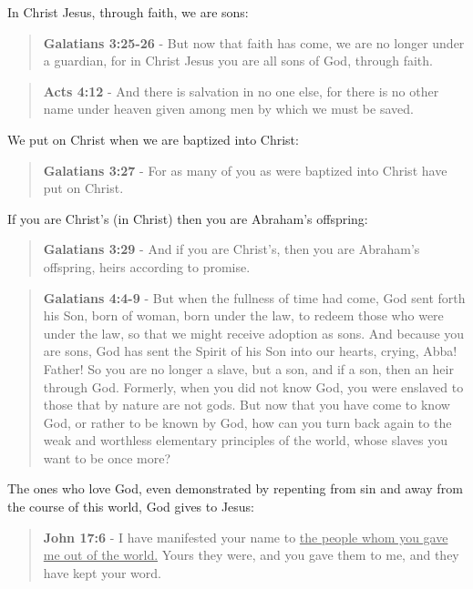 \documentclass[11pt]{article}
\begin{document}
In Christ Jesus, through faith, we are sons:

\begin{quote}
\textbf{Galatians 3:25-26} - But now that faith has come, we are no longer under a guardian, for in Christ Jesus you are all sons of God, through faith.
\end{quote}

\begin{quote}
\textbf{Acts 4:12} - And there is salvation in no one else, for there is no other name under heaven given among men by which we must be saved.
\end{quote}

We put on Christ when we are baptized into Christ:

\begin{quote}
\textbf{Galatians 3:27} - For as many of you as were baptized into Christ have put on Christ.
\end{quote}

If you are Christ's (in Christ) then you are Abraham's offspring:

\begin{quote}
\textbf{Galatians 3:29} - And if you are Christ's, then you are Abraham's offspring, heirs according to promise.
\end{quote}

\begin{quote}
\textbf{Galatians 4:4-9} - But when the fullness of time had come, God sent forth his Son, born of woman, born under the law, to redeem those who were under the law, so that we might receive adoption as sons.  And because you are sons, God has sent the Spirit of his Son into our hearts, crying, Abba! Father!  So you are no longer a slave, but a son, and if a son, then an heir through God.  Formerly, when you did not know God, you were enslaved to those that by nature are not gods.  But now that you have come to know God, or rather to be known by God, how can you turn back again to the weak and worthless elementary principles of the world, whose slaves you want to be once more?
\end{quote}

The ones who love God, even demonstrated by repenting from sin and away from the course of this world, God gives to Jesus:

\begin{quote}
\textbf{John 17:6} - I have manifested your name to \uline{the people whom you gave me out of the world.} Yours they were, and you gave them to me, and they have kept your word.
\end{quote}
\end{document}
